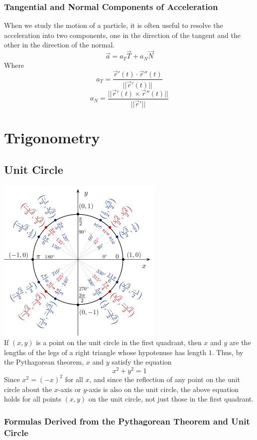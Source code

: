 \documentclass[10pt]{report}
\begin{document}
\section{Tangential and Normal Components of Acceleration}
When we study the motion of a particle, it is often useful to resolve the acceleration into two components, one in the direction of the tangent and the other in the direction of the normal.
$$\vec{a} = a_T\vec{T} + a_N\vec{N}$$
Where
$$a_T = \frac{\vec{r}'(t) \cdot \vec{r}''(t)}{||\vec{r}'(t)||}$$
$$a_N = \frac{||\vec{r}'(t) \times \vec{r}'' (t)||}{||\vec{r}'||}$$

\part{Trigonometry}
\chapter{Unit Circle}
\includegraphics[scale=.75]{Unit_circle_angles_color}\\
If $(x, y)$ is a point on the unit circle in the first quadrant, then $x$ and $y$ are the lengths of the legs of a right triangle whose hypotenuse has length $1$. Thus, by the Pythagorean theorem, $x$ and $y$ satisfy the equation
$$x^2+y^2=1$$
Since $x^2 = (-x)^2$ for all $x$, and since the reflection of any point on the unit circle about the $x$-axis or $y$-axis is also on the unit circle, the above equation holds for all points $(x, y)$ on the unit circle, not just those in the first quadrant.

\section{Formulas Derived from the Pythagorean Theorem and Unit Circle}
\end{document}
